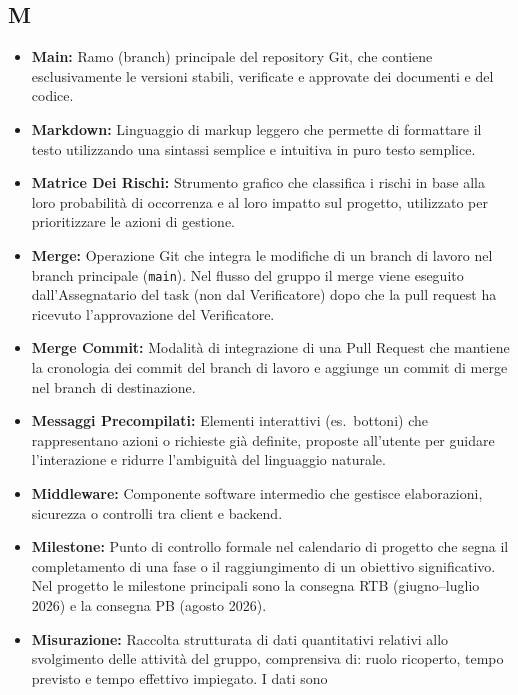 {}
\subsection*{M}
\begin{itemize}[leftmargin=*]
      \item \textbf{Main:} Ramo (branch) principale del repository Git, che contiene esclusivamente le versioni stabili, verificate e approvate dei documenti e del codice.
      \item \textbf{Markdown:} Linguaggio di markup leggero che permette di formattare il testo utilizzando una sintassi semplice e intuitiva in puro testo semplice.
      \item \textbf{Matrice Dei Rischi:} Strumento grafico che classifica i rischi in base alla loro probabilità di occorrenza e al loro impatto sul progetto, utilizzato per prioritizzare le azioni di gestione.
      \item \textbf{Merge:} Operazione Git che integra le modifiche di un branch
      di lavoro nel branch principale (\texttt{main}). Nel flusso del gruppo
      il merge viene eseguito dall'Assegnatario del task (non dal Verificatore)
      dopo che la pull request ha ricevuto l'approvazione del Verificatore.
      \item \textbf{Merge Commit:} Modalità di integrazione di una Pull Request che mantiene la cronologia dei commit del branch di lavoro e aggiunge un commit di merge nel branch di destinazione.
      \item \textbf{Messaggi Precompilati:} Elementi interattivi (es.\ bottoni) che rappresentano azioni o richieste già definite, proposte all'utente per guidare l'interazione e ridurre l'ambiguità del linguaggio naturale.
      \item \textbf{Middleware:} Componente software intermedio che gestisce elaborazioni, sicurezza o controlli tra client e backend.
      \item \textbf{Milestone:} Punto di controllo formale nel calendario di progetto che
      segna il completamento di una fase o il raggiungimento di un obiettivo
      significativo. Nel progetto le milestone principali sono la consegna RTB
      (giugno--luglio 2026) e la consegna PB (agosto 2026).
      \item \textbf{Misurazione:} Raccolta strutturata di dati quantitativi relativi
          allo svolgimento delle attività del gruppo, comprensiva di: ruolo
          ricoperto, tempo previsto e tempo effettivo impiegato. I dati sono

\end{itemize}
